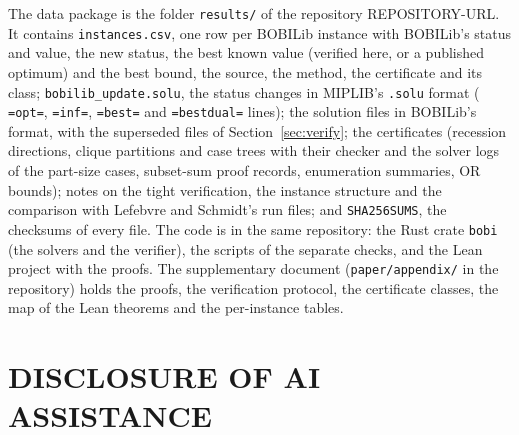 \documentclass[]{spie}  %
\newcommand{\repourl}{REPOSITORY-URL}
\theoremstyle{plain}
\newcommand{\code}[1]{\texttt{#1}}
\begin{document}
The data package is the folder \code{results/} of the repository \repourl{}. It contains \code{instances.csv}, one row per BOBILib instance with BOBILib's
status and value, the new status, the best known value (verified here, or a published optimum)
and the best bound, the source, the method, the certificate and its class; \code{bobilib\_update.solu}, the status changes in MIPLIB's
\code{.solu} format (\NumSoluOpt{} \code{=opt=}, \NumSoluInf{} \code{=inf=}, \NumSoluBest{}
\code{=best=} and \NumSoluBestDual{} \code{=bestdual=} lines); the solution files in BOBILib's
format, with the superseded files of Section~\ref{sec:verify}; the certificates (recession
directions, clique partitions and case trees with their checker and the solver logs of the
part-size cases, subset-sum proof records, enumeration summaries, OR bounds); notes on the tight
verification, the instance structure and the comparison with Lefebvre and Schmidt's run files; and
\code{SHA256SUMS}, the checksums of every file. The code is in the same repository: the Rust crate
\code{bobi} (the solvers and the verifier), the scripts of the separate checks, and the Lean
project with the proofs. The supplementary document (\code{paper/appendix/} in the repository)
holds the proofs, the verification protocol, the certificate classes, the map of the Lean theorems
and the per-instance tables.

\section*{DISCLOSURE OF AI ASSISTANCE}
\end{document}
